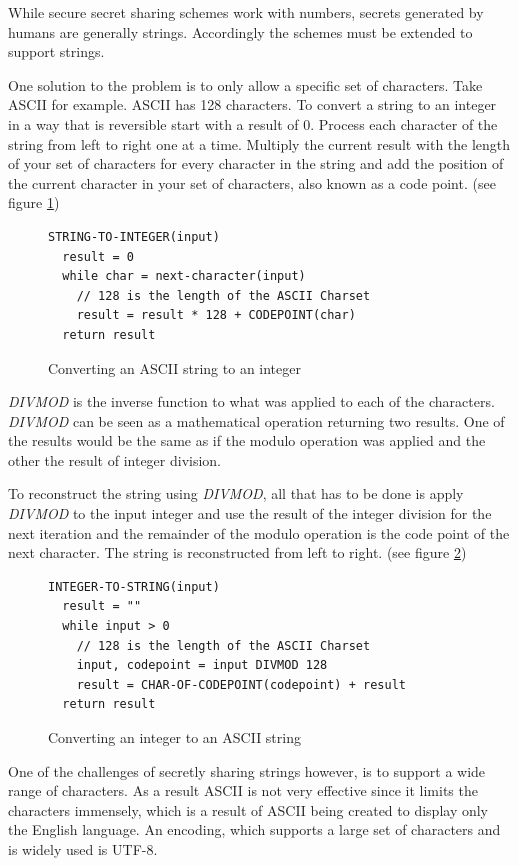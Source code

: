 While secure secret sharing schemes work with numbers, secrets generated by
humans are generally strings. Accordingly the schemes must be extended to
support strings.

One solution to the problem is to only allow a specific set of characters. Take
ASCII for example. ASCII has 128 characters. To convert a string to an integer
in a way that is reversible start with a result of 0. Process each character of
the string from left to right one at a time. Multiply the current result with
the length of your set of characters for every character in the string and add
the position of the current character in your set of characters, also known as
a code point. (see figure \ref{code:stringToInteger})

\begin{figure}
\begin{lstlisting}
STRING-TO-INTEGER(input)
  result = 0
  while char = next-character(input)
    // 128 is the length of the ASCII Charset
    result = result * 128 + CODEPOINT(char)
  return result
\end{lstlisting}
\caption{Converting an ASCII string to an integer}
\label{code:stringToInteger}
\end{figure}

\textit{DIVMOD} is the inverse function to what was applied to each of the
characters. \textit{DIVMOD} can be seen as a mathematical operation returning
two results. One of the results would be the same as if the modulo operation
was applied and the other the result of integer division.

To reconstruct the string using \textit{DIVMOD}, all that has to be done is
apply \textit{DIVMOD} to the input integer and use the result of the integer
division for the next iteration and the remainder of the modulo operation is
the code point of the next character. The string is reconstructed from left to
right. (see figure \ref{code:integerToString})

\begin{figure}
\begin{lstlisting}
INTEGER-TO-STRING(input)
  result = ""
  while input > 0
    // 128 is the length of the ASCII Charset
    input, codepoint = input DIVMOD 128
    result = CHAR-OF-CODEPOINT(codepoint) + result
  return result
\end{lstlisting}
\caption{Converting an integer to an ASCII string}
\label{code:integerToString}
\end{figure}

One of the challenges of secretly sharing strings however, is to support a wide
range of characters. As a result ASCII is not very effective since it limits
the characters immensely, which is a result of ASCII being created to display
only the English language. An encoding, which supports a large set of
characters and is widely used is UTF-8.

